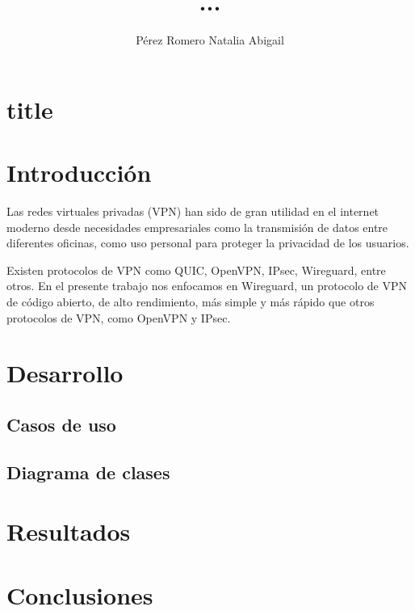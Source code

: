 \documentclass[letterpaper,12pt,oneside]{book}
\author{Pérez Romero Natalia Abigail}
\title{ ...}
\begin{document}
\frontmatter
\maketitle


\mainmatter

\chapter{title}

\chapter{Introducción} %

Las redes virtuales privadas (VPN) han sido de gran utilidad en el internet moderno desde necesidades empresariales como la transmisión de datos entre diferentes oficinas, como uso personal para proteger la privacidad de los usuarios. 

Existen protocolos de VPN como QUIC, OpenVPN, IPsec, Wireguard, entre otros. 
En el presente trabajo nos enfocamos en Wireguard, un protocolo de VPN de código abierto, de alto rendimiento, más simple y más rápido que otros protocolos de VPN, como OpenVPN y IPsec.





\chapter{Desarrollo}

\section{Casos de uso}

\newpage


\newpage
\section{Diagrama de clases}


\chapter{Resultados}  %

\chapter{Conclusiones}  %


\end{document}
